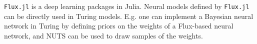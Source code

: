 \documentclass[
    17pt,
    margin=1in,
    innermargin=-4.5in,
    blockverticalspace=-0.15in
]{tikzposter}
\begin{document}
\begin{columns}
{    \texttt{Flux.jl} is a deep learning packages in Julia.
    Neural models defined by \texttt{Flux.jl} can be directly used in Turing models.
    E.g. one can implement a Bayesian neural network in Turing by 
    defining priors on the weights of a Flux-based neural network, and 
    NUTS can be used to draw samples of the weights.
}


    
\end{columns}
\end{document}
